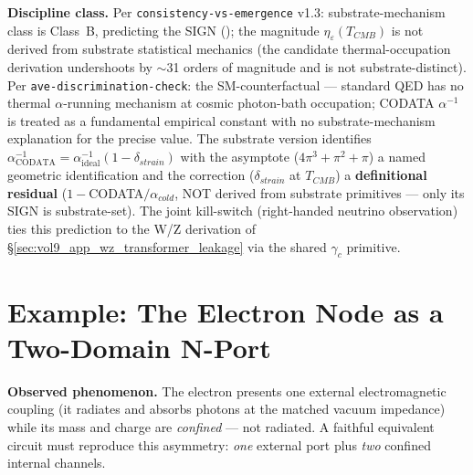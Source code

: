 \textbf{Discipline class.} Per \texttt{consistency-vs-emergence} v1.3: substrate-mechanism class is Class~B, predicting the SIGN (); the magnitude $\eta_\varepsilon(T_{CMB})$ is not derived from substrate statistical mechanics (the candidate thermal-occupation derivation undershoots by $\sim$31 orders of magnitude and is not substrate-distinct). Per \texttt{ave-discrimination-check}: the SM-counterfactual --- standard QED has no thermal $\alpha$-running mechanism at cosmic photon-bath occupation; CODATA $\alpha^{-1}$ is treated as a fundamental empirical constant with no substrate-mechanism explanation for the precise value. The substrate version identifies $\alpha^{-1}_{\text{CODATA}} = \alpha^{-1}_{\text{ideal}}(1 - \delta_{strain})$ with the asymptote ($4\pi^3 + \pi^2 + \pi$) a named geometric identification and the correction ($\delta_{strain}$ at $T_{CMB}$) a \textbf{definitional residual} ($1-$CODATA$/\alpha_{cold}$, NOT derived from substrate primitives --- only its SIGN is substrate-set). The joint kill-switch (right-handed neutrino observation) ties this prediction to the W/Z derivation of \S\ref{sec:vol9_app_wz_transformer_leakage} via the shared $\gamma_c$ primitive.

\section{Example: The Electron Node as a Two-Domain N-Port}
\label{sec:vol9_app_node_2domain_nport}

\textbf{Observed phenomenon.} The electron presents one external electromagnetic coupling (it radiates and absorbs photons at the matched vacuum impedance) while its mass and charge are \emph{confined} --- not radiated. A faithful equivalent circuit must reproduce this asymmetry: \emph{one} external port plus \emph{two} confined internal channels.

